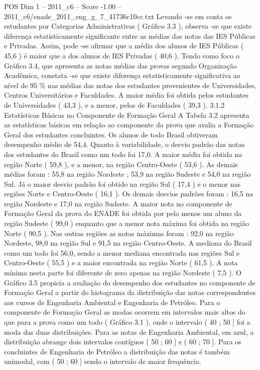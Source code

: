 \begin{textsample}{POS Dim 1 – 2011\_c6 – Score -1.00 – 2011\_c6/enade\_2011\_eng\_g\_7\_41736c10cc.txt}
Levando -se em conta os estudantes por Categorias Administrativas ( Gráfico 3.3 ), observa -se que existe diferença estatisticamente significante entre as médias das notas das IES Públicas e Privadas.
Assim, pode -se afirmar que a média dos alunos de IES Públicas ( 45,6 ) é maior que a dos alunos de IES Privadas ( 40,6 ).
Tendo como foco o Gráfico 3.4, que apresenta as notas médias das provas segundo Organização Acadêmica, constata -se que existe diferença estatisticamente significativa ao nível de 95 \% nas médias das notas dos estudantes provenientes de Universidades, Centros Universitários e Faculdades.
A maior média foi obtida pelos estudantes de Universidades ( 43,3 ), e a menor, pelos de Faculdades ( 39,3 ). 3.1.2 Estatísticas Básicas no Componente de Formação Geral A Tabela 3.2 apresenta as estatísticas básicas em relação ao componente da prova que avalia a Formação Geral dos estudantes concluintes.
Os alunos de todo Brasil obtiveram desempenho médio de 54,4.
Quanto à variabilidade, o desvio padrão das notas dos estudantes do Brasil como um todo foi 17,0.
A maior média foi obtida na região Norte ( 59,8 ), e a menor, na região Centro-Oeste ( 53,6 ).
As demais médias foram : 55,8 na região Nordeste ; 53,9 na região Sudeste e 54,0 na região Sul.
Já o maior desvio padrão foi obtido na região Sul ( 17,4 ) e o menor nas regiões Norte e Centro-Oeste ( 16,1 ).
Os demais desvios padrões foram : 16,5 na região Nordeste e 17,0 na região Sudeste.
A maior nota no componente de Formação Geral da prova do ENADE foi obtida por pelo menos um aluno da região Sudeste ( 99,0 ) enquanto que a menor nota máxima foi obtida na região Norte ( 90,5 ).
Nas outras regiões as notas máximas foram : 92,0 na região Nordeste, 98,0 na região Sul e 91,5 na região Centro-Oeste.
A mediana do Brasil como um todo foi 56,0, sendo a menor mediana encontrada nas regiões Sul e Centro-Oeste ( 55,5 ) e a maior encontrada na região Norte ( 61,5 ).
A nota mínima nesta parte foi diferente de zero apenas na região Nordeste ( 7,5 ).
O Gráfico 3.5 propicia a avaliação do desempenho dos estudantes no componente de Formação Geral a partir do histograma da distribuição das notas correspondentes aos cursos de Engenharia Ambiental e Engenharia de Petróleo.
Para o componente de Formação Geral as modas ocorrem em intervalos mais altos do que para a prova como um todo ( Gráfico 3.1 ), onde o intervalo ( 40 ; 50 ] foi a moda das duas distribuições.
Para as notas de Engenharia Ambiental, em azul, a distribuição abrange dois intervalos contíguos ( 50 ; 60 ] e ( 60 ; 70 ].
Para os concluintes de Engenharia de Petróleo a distribuição das notas é também unimodal, com ( 50 ; 60 ] sendo o intervalo de maior frequência.

\end{textsample}
